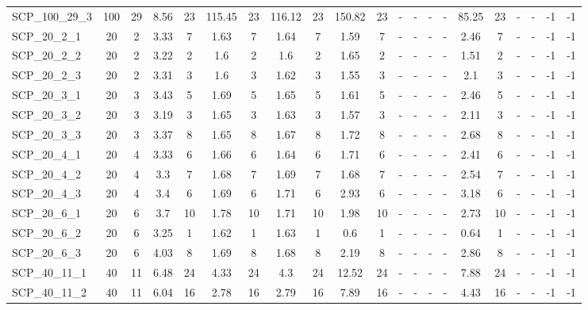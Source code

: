\begin{sidewaystable}[!ht]
{\begin{tabular}{lcccccccccccccccccccc}
SCP\_100\_29\_3 & 100 & 29 &  \textcolor{blue2}{8.56} & 23 & 115.45 & 23 & 116.12 & 23 & 150.82 & 23 &  - &  - &  - &  - & 85.25 & 23 &  - &  - & -1 & -1 \\
SCP\_20\_2\_1 & 20 & 2 & 3.33 & 7 & 1.63 & 7 & 1.64 & 7 &  \textcolor{blue2}{1.59} & 7 &  - &  - &  - &  - & 2.46 & 7 &  - &  - & -1 & -1 \\
SCP\_20\_2\_2 & 20 & 2 & 3.22 & 2 & 1.6 & 2 & 1.6 & 2 & 1.65 & 2 &  - &  - &  - &  - &  \textcolor{blue2}{1.51} & 2 &  - &  - & -1 & -1 \\
SCP\_20\_2\_3 & 20 & 2 & 3.31 & 3 & 1.6 & 3 & 1.62 & 3 &  \textcolor{blue2}{1.55} & 3 &  - &  - &  - &  - & 2.1 & 3 &  - &  - & -1 & -1 \\
SCP\_20\_3\_1 & 20 & 3 & 3.43 & 5 & 1.69 & 5 & 1.65 & 5 &  \textcolor{blue2}{1.61} & 5 &  - &  - &  - &  - & 2.46 & 5 &  - &  - & -1 & -1 \\
SCP\_20\_3\_2 & 20 & 3 & 3.19 & 3 & 1.65 & 3 & 1.63 & 3 &  \textcolor{blue2}{1.57} & 3 &  - &  - &  - &  - & 2.11 & 3 &  - &  - & -1 & -1 \\
SCP\_20\_3\_3 & 20 & 3 & 3.37 & 8 &  \textcolor{blue2}{1.65} & 8 & 1.67 & 8 & 1.72 & 8 &  - &  - &  - &  - & 2.68 & 8 &  - &  - & -1 & -1 \\
SCP\_20\_4\_1 & 20 & 4 & 3.33 & 6 & 1.66 & 6 &  \textcolor{blue2}{1.64} & 6 & 1.71 & 6 &  - &  - &  - &  - & 2.41 & 6 &  - &  - & -1 & -1 \\
SCP\_20\_4\_2 & 20 & 4 & 3.3 & 7 &  \textcolor{blue2}{1.68} & 7 & 1.69 & 7 &  \textcolor{blue2}{1.68} & 7 &  - &  - &  - &  - & 2.54 & 7 &  - &  - & -1 & -1 \\
SCP\_20\_4\_3 & 20 & 4 & 3.4 & 6 &  \textcolor{blue2}{1.69} & 6 & 1.71 & 6 & 2.93 & 6 &  - &  - &  - &  - & 3.18 & 6 &  - &  - & -1 & -1 \\
SCP\_20\_6\_1 & 20 & 6 & 3.7 & 10 & 1.78 & 10 &  \textcolor{blue2}{1.71} & 10 & 1.98 & 10 &  - &  - &  - &  - & 2.73 & 10 &  - &  - & -1 & -1 \\
SCP\_20\_6\_2 & 20 & 6 & 3.25 & 1 & 1.62 & 1 & 1.63 & 1 &  \textcolor{blue2}{0.6} & 1 &  - &  - &  - &  - & 0.64 & 1 &  - &  - & -1 & -1 \\
SCP\_20\_6\_3 & 20 & 6 & 4.03 & 8 & 1.69 & 8 &  \textcolor{blue2}{1.68} & 8 & 2.19 & 8 &  - &  - &  - &  - & 2.86 & 8 &  - &  - & -1 & -1 \\
SCP\_40\_11\_1 & 40 & 11 & 6.48 & 24 & 4.33 & 24 &  \textcolor{blue2}{4.3} & 24 & 12.52 & 24 &  - &  - &  - &  - & 7.88 & 24 &  - &  - & -1 & -1 \\
SCP\_40\_11\_2 & 40 & 11 & 6.04 & 16 &  \textcolor{blue2}{2.78} & 16 & 2.79 & 16 & 7.89 & 16 &  - &  - &  - &  - & 4.43 & 16 &  - &  - & -1 & -1 \\

\end{tabular}}
\end{sidewaystable}
